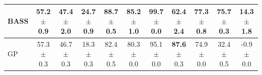 \begin{table}[t]
\begin{tabular}{lcccccccccc}
\midrule
\shortstack[l]{BASS \\ {}} & \shortstack{57.2 \\ $\pm$ 0.9} & \shortstack{47.4 \\ $\pm$ 2.0} & \shortstack{24.7 \\ $\pm$ 0.9} & \shortstack{88.7 \\ $\pm$ 0.5} & \shortstack{85.2 \\ $\pm$ 1.0} & \shortstack{99.7 \\ $\pm$ 0.0} & \shortstack{62.4 \\ $\pm$ 2.4} & \shortstack{77.3 \\ $\pm$ 0.8} & \shortstack{75.7 \\ $\pm$ 0.3} & \shortstack{14.3 \\ $\pm$ 1.8} \\
\midrule
\shortstack[l]{GP \\ {}} & \shortstack{57.3 \\ $\pm$ 0.3} & \shortstack{46.7 \\ $\pm$ 0.3} & \shortstack{18.3 \\ $\pm$ 0.3} & \shortstack{82.4 \\ $\pm$ 0.5} & \shortstack{80.3 \\ $\pm$ 0.0} & \shortstack{95.1 \\ $\pm$ 0.0} & \shortstack{\textbf{87.6} \\ $\pm$ 0.3} & \shortstack{74.9 \\ $\pm$ 0.0} & \shortstack{32.4 \\ $\pm$ 0.5} & \shortstack{-0.9 \\ $\pm$ 0.0} \\
\bottomrule
\end{tabular}
\end{table}

